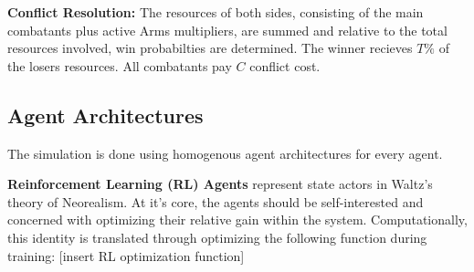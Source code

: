 %

\noindent\textbf{Conflict Resolution:} The resources of both sides, consisting of the main combatants plus active Arms multipliers, are summed and relative to the total resources involved, win probabilties are determined.
The winner recieves $T\%$ of the losers resources. All combatants pay $C$ conflict cost.


\subsection{Agent Architectures}
%

The simulation is done using homogenous agent architectures for every agent.

\textbf{Reinforcement Learning (RL) Agents} represent state actors in Waltz's theory of Neorealism. At it's core, the agents should be self-interested and concerned with optimizing their relative gain within the system. Computationally, this identity is translated through optimizing the following function during training:
[insert RL optimization function]

